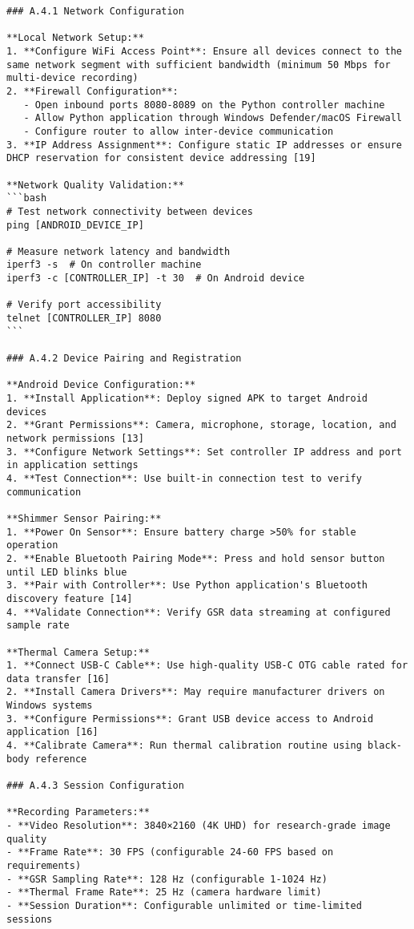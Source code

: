 \begin{verbatim}
### A.4.1 Network Configuration

**Local Network Setup:**
1. **Configure WiFi Access Point**: Ensure all devices connect to the same network segment with sufficient bandwidth (minimum 50 Mbps for multi-device recording)
2. **Firewall Configuration**:
   - Open inbound ports 8080-8089 on the Python controller machine
   - Allow Python application through Windows Defender/macOS Firewall
   - Configure router to allow inter-device communication
3. **IP Address Assignment**: Configure static IP addresses or ensure DHCP reservation for consistent device addressing [19]

**Network Quality Validation:**
```bash
# Test network connectivity between devices
ping [ANDROID_DEVICE_IP]

# Measure network latency and bandwidth
iperf3 -s  # On controller machine
iperf3 -c [CONTROLLER_IP] -t 30  # On Android device

# Verify port accessibility
telnet [CONTROLLER_IP] 8080
```

### A.4.2 Device Pairing and Registration

**Android Device Configuration:**
1. **Install Application**: Deploy signed APK to target Android devices
2. **Grant Permissions**: Camera, microphone, storage, location, and network permissions [13]
3. **Configure Network Settings**: Set controller IP address and port in application settings
4. **Test Connection**: Use built-in connection test to verify communication

**Shimmer Sensor Pairing:**
1. **Power On Sensor**: Ensure battery charge >50% for stable operation
2. **Enable Bluetooth Pairing Mode**: Press and hold sensor button until LED blinks blue
3. **Pair with Controller**: Use Python application's Bluetooth discovery feature [14]
4. **Validate Connection**: Verify GSR data streaming at configured sample rate

**Thermal Camera Setup:**
1. **Connect USB-C Cable**: Use high-quality USB-C OTG cable rated for data transfer [16]
2. **Install Camera Drivers**: May require manufacturer drivers on Windows systems
3. **Configure Permissions**: Grant USB device access to Android application [16]
4. **Calibrate Camera**: Run thermal calibration routine using black-body reference

### A.4.3 Session Configuration

**Recording Parameters:**
- **Video Resolution**: 3840×2160 (4K UHD) for research-grade image quality
- **Frame Rate**: 30 FPS (configurable 24-60 FPS based on requirements)
- **GSR Sampling Rate**: 128 Hz (configurable 1-1024 Hz)
- **Thermal Frame Rate**: 25 Hz (camera hardware limit)
- **Session Duration**: Configurable unlimited or time-limited sessions


\end{verbatim}
